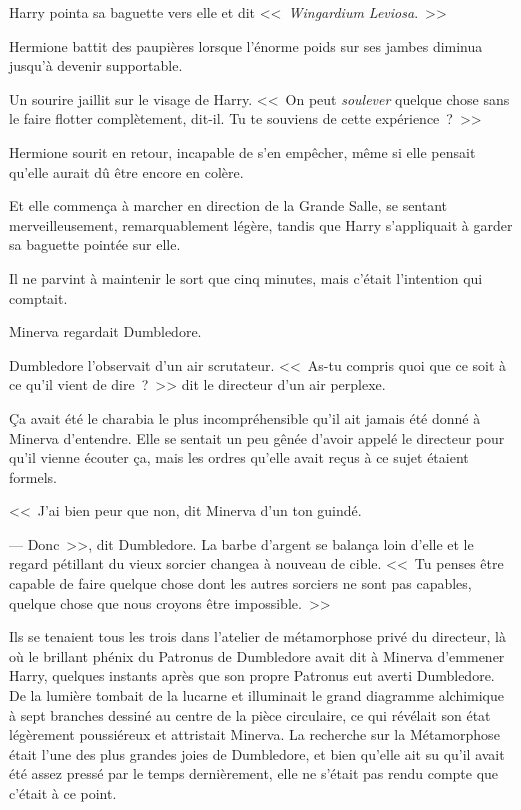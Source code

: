 Harry pointa sa baguette vers elle et dit <<~\emph{Wingardium Leviosa}.~>>

Hermione battit des paupières lorsque l'énorme poids sur ses jambes diminua jusqu'à devenir supportable.

Un sourire jaillit sur le visage de Harry. <<~On peut \emph{soulever} quelque chose sans le faire flotter complètement, dit-il. Tu te souviens de cette expérience~?~>>

Hermione sourit en retour, incapable de s'en empêcher, même si elle pensait qu'elle aurait dû être encore en colère.

Et elle commença à marcher en direction de la Grande Salle, se sentant merveilleusement, remarquablement légère, tandis que Harry s'appliquait à garder sa baguette pointée sur elle.

Il ne parvint à maintenir le sort que cinq minutes, mais c'était l'intention qui comptait.

\later

Minerva regardait Dumbledore.

Dumbledore l'observait d'un air scrutateur. <<~As-tu compris quoi que ce soit à ce qu'il vient de dire~?~>> dit le directeur d'un air perplexe.

Ça avait été le charabia le plus incompréhensible qu'il ait jamais été donné à Minerva d'entendre. Elle se sentait un peu gênée d'avoir appelé le directeur pour qu'il vienne écouter ça, mais les ordres qu'elle avait reçus à ce sujet étaient formels.

<<~J'ai bien peur que non, dit Minerva d'un ton guindé.

--- Donc~>>, dit Dumbledore. La barbe d'argent se balança loin d'elle et le regard pétillant du vieux sorcier changea à nouveau de cible. <<~Tu penses être capable de faire quelque chose dont les autres sorciers ne sont pas capables, quelque chose que nous croyons être impossible.~>>

Ils se tenaient tous les trois dans l'atelier de métamorphose privé du directeur, là où le brillant phénix du Patronus de Dumbledore avait dit à Minerva d'emmener Harry, quelques instants après que son propre Patronus eut averti Dumbledore. De la lumière tombait de la lucarne et illuminait le grand diagramme alchimique à sept branches dessiné au centre de la pièce circulaire, ce qui révélait son état légèrement poussiéreux et attristait Minerva. La recherche sur la Métamorphose était l'une des plus grandes joies de Dumbledore, et bien qu'elle ait su qu'il avait été assez pressé par le temps dernièrement, elle ne s'était pas rendu compte que c'était à ce point.


